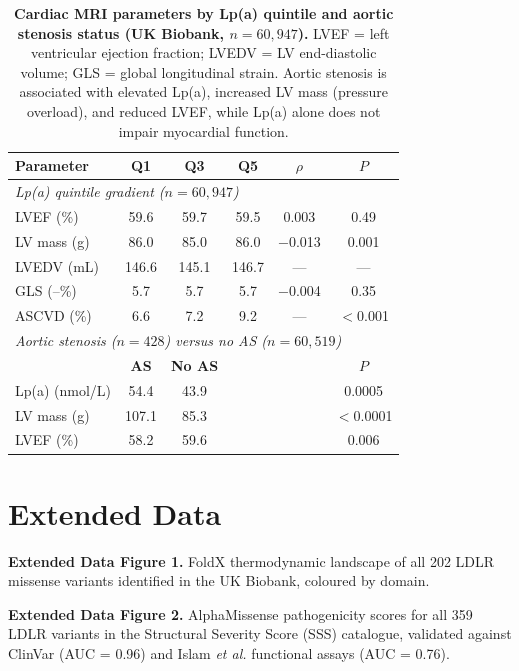 \documentclass[11pt,a4paper]{article}
\begin{document}
\begin{table}[H]
\centering
\caption{\textbf{Cardiac MRI parameters by Lp(a) quintile and aortic stenosis status (UK Biobank, $n = 60{,}947$).} LVEF = left ventricular ejection fraction; LVEDV = LV end-diastolic volume; GLS = global longitudinal strain. Aortic stenosis is associated with elevated Lp(a), increased LV mass (pressure overload), and reduced LVEF, while Lp(a) alone does not impair myocardial function.}
\label{tab:cmr}
\small
\begin{tabular}{@{}lccccc@{}}
\toprule
\textbf{Parameter} & \textbf{Q1} & \textbf{Q3} & \textbf{Q5} & \textbf{$\rho$} & \textbf{$P$} \\
\midrule
\multicolumn{6}{l}{\textit{Lp(a) quintile gradient ($n = 60{,}947$)}} \\
LVEF (\%) & 59.6 & 59.7 & 59.5 & 0.003 & 0.49 \\
LV mass (g) & 86.0 & 85.0 & 86.0 & $-$0.013 & 0.001 \\
LVEDV (mL) & 146.6 & 145.1 & 146.7 & --- & --- \\
GLS (--\%) & 5.7 & 5.7 & 5.7 & $-$0.004 & 0.35 \\
ASCVD (\%) & 6.6 & 7.2 & 9.2 & --- & $<$0.001 \\
\midrule
\multicolumn{6}{l}{\textit{Aortic stenosis ($n = 428$) versus no AS ($n = 60{,}519$)}} \\
& \textbf{AS} & \textbf{No AS} & & & \textbf{$P$} \\
Lp(a) (nmol/L) & 54.4 & 43.9 & & & 0.0005 \\
LV mass (g) & 107.1 & 85.3 & & & $<$0.0001 \\
LVEF (\%) & 58.2 & 59.6 & & & 0.006 \\
\bottomrule
\end{tabular}
\end{table}

\clearpage
\section*{Extended Data}

\textbf{Extended Data Figure 1.} FoldX thermodynamic landscape of all 202 LDLR missense variants identified in the UK Biobank, coloured by domain.

\textbf{Extended Data Figure 2.} AlphaMissense pathogenicity scores for all 359 LDLR variants in the Structural Severity Score (SSS) catalogue, validated against ClinVar (AUC = 0.96) and Islam \textit{et al.} functional assays (AUC = 0.76).
\end{document}
